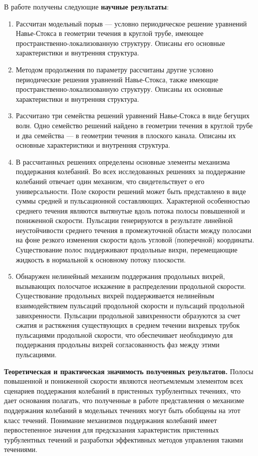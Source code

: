 В работе получены следующие {\bf научные результаты}:
\begin{enumerate}
\item Рассчитан модельный порыв --- условно периодическое решение уравнений Навье-Стокса в геометрии течения в круглой трубе, имеющее пространственно-локализованную структуру. Описаны его основные характеристики и внутренняя структура. 
\item Методом продолжения по параметру рассчитаны другие условно периодические решения уравнений Навье-Стокса, также имеющие про\-странственно-локализованную структуру. Описаны их основные характеристики и внутренняя структура. 
\item Рассчитано три семейства решений уравнений Навье-Стокса в виде бегущих волн. Одно семейство решений найдено в геометрии течения в круглой трубе и два семейства --- в геометрии течения в плоского канала. Описаны их основные характеристики и внутренняя структура. 
\item В рассчитанных решениях определены основные элементы механизма поддержания колебаний. Во всех исследованных решениях за поддержание колебаний отвечает один механизм, что свидетельствует о его универсальности. 
Поле скорости решений может быть представлено в виде суммы средней и пульсационной составляющих. Характерной особенностью среднего течения являются вытянутые вдоль потока полосы повышенной и пониженной скорости. Пульсации генерируются в результате линейной неустойчивости среднего течения в промежуточной области между полосами на фоне резкого изменения скорости вдоль угловой (поперечной) координаты. Существование полос поддерживают продольные вихри, перемещающие жидкость в нормальной к основному потоку плоскости.
\item Обнаружен нелинейный механизм поддержания продольных вихрей, вызывающих полосчатое искажение в распределении продольной скорости. Существование продольных вихрей поддерживается нелинейным взаимодействием пульсаций продольной скорости и пульсаций продольной завихренности. Пульсации продольной завихренности образуются за счет сжатия и растяжения существующих в среднем течении вихревых трубок пульсациями продольной скорости, что обеспечивает необходимую для поддержания продольны вихрей согласованность фаз между этими пульсациями. 
\end{enumerate}

{\bf Теоретическая и практическая значимость полученных результатов.}
Полосы повышенной и пониженной скорости являются неотъемлемым элементом всех сценариев поддержания колебаний в пристенных турбулентных течениях, что дает основания полагать, что полученные в работе представления о механизме поддержания колебаний в модельных течениях могут быть обобщены на этот класс течений. Понимание механизмов поддержания колебаний имеет первостепенное значения для предсказания характеристик пристенных турбулентных течений и разработки эффективных методов управления такими течениями.

